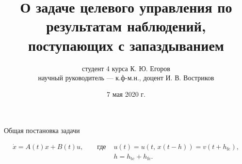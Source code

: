 
\usepackage{tikz}
\usepackage{adjustbox}
\title[Выпускная квалификационная работа]
        {О задаче целевого управления по результатам наблюдений, поступающих с запаздыванием}
\author[К. Ю. Егоров]
        {студент 4 курса К. Ю. Егоров\\
        научный руководитель --- к.ф-м.н., доцент И. В. Востриков}
\date{7 мая 2020 г.}


        \maketitle
        \begin{frame}[t]{Общая постановка задачи}
                \centering
                
                \vspace{0.5cm}
                \begin{equation*}
                        \begin{aligned}
                                \dot x = A(t)x + B(t)u, \qquad\mbox{где }
                                &u(t) = u(t,\,x(t - h)) = v(t + h_{\mathrm{fc}}),\\
                                &h = h_{\mathrm{tc}} + h_{\mathrm{fc}}.
                        \end{aligned}
                \end{equation*}
        \end{frame}
